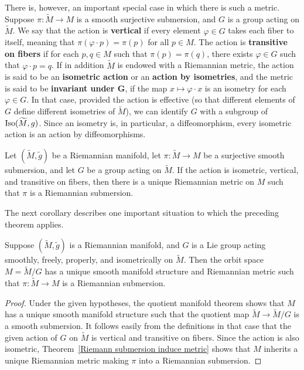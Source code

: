 There is, however, an important special case in which there is such a metric. Suppose 
$\pi:\widetilde{M}\to M$ is a smooth surjective submersion, and $G$ is a group 
acting on $\widetilde{M}$. We say that the action is \textbf{vertical} if every 
element $\varphi\in G$ takes each fiber to itself, meaning that $\pi(\varphi\cdot p)=\pi(p)$ 
for all $p\in M$. The action is \textbf{transitive on fibers} if for each $p,q\in M$ 
such that $\pi(p)=\pi(q)$, there exists $\varphi\in G$ such that $\varphi\cdot p=q$.
If in addition $\widetilde{M}$ is endowed with a Riemannian metric, the action 
is said to be an \textbf{isometric action} or an \textbf{action by isometries}, 
and the metric is said to be \textbf{invariant under $\bm{G}$}, if the map $x\mapsto\varphi\cdot x$ 
is an isometry for each $\varphi\in G$. In that case, provided the action is 
effective (so that different elements of $G$ define different isometries of $\widetilde{M}$), 
we can identify $G$ with a subgroup of $\mathrm{Iso}(\widetilde{M},g)$. Since an isometry 
is, in particular, a diffeomorphism, every isometric action is an action by diffeomorphisms.
\begin{theorem}\label{Riemann submersion induce metric}
Let $(\widetilde{M},\widetilde{g})$ be a Riemannian manifold, let $\pi:\widetilde{M}\to M$ 
be a surjective smooth submersion, and let $G$ be a group acting on $\widetilde{M}$. 
If the action is isometric, vertical, and transitive on fibers, then there is a 
unique Riemannian metric on $M$ such that $\pi$ is a Riemannian submersion.
\end{theorem}
The next corollary describes one important situation to which the preceding theorem
applies.
\begin{corollary}\label{Riemann orbit space induce metric}
Suppose $(\widetilde{M},\widetilde{g})$ is a Riemannian manifold, and $G$ is a Lie 
group acting smoothly, freely, properly, and isometrically on $\widetilde{M}$. Then 
the orbit space $M=\widetilde{M}/G$ has a unique smooth manifold structure and 
Riemannian metric such that $\pi:\widetilde{M}\to M$ is a Riemannian submersion.
\end{corollary}
\begin{proof}
Under the given hypotheses, the quotient manifold theorem shows that $M$ has a 
unique smooth manifold structure such that the quotient map $\widetilde{M}\to\widetilde{M}/G$ 
is a smooth submersion. It follows easily from the definitions in that case that 
the given action of $G$ on $\widetilde{M}$ is vertical and transitive on fibers. 
Since the action is also isometric, Theorem~\ref{Riemann submersion induce metric} shows that $M$ inherits a 
unique Riemannian metric making $\pi$ into a Riemannian submersion.
\end{proof}
